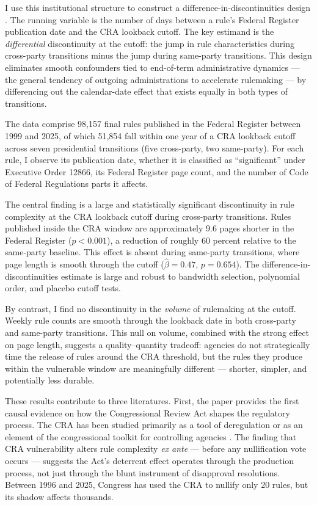\documentclass[12pt]{article}
\begin{document}
I use this institutional structure to construct a difference-in-discontinuities design \citep{grembi2016}. The running variable is the number of days between a rule's Federal Register publication date and the CRA lookback cutoff. The key estimand is the \textit{differential} discontinuity at the cutoff: the jump in rule characteristics during cross-party transitions minus the jump during same-party transitions. This design eliminates smooth confounders tied to end-of-term administrative dynamics --- the general tendency of outgoing administrations to accelerate rulemaking --- by differencing out the calendar-date effect that exists equally in both types of transitions.

The data comprise 98,157 final rules published in the Federal Register between 1999 and 2025, of which 51,854 fall within one year of a CRA lookback cutoff across seven presidential transitions (five cross-party, two same-party). For each rule, I observe its publication date, whether it is classified as ``significant'' under Executive Order 12866, its Federal Register page count, and the number of Code of Federal Regulations parts it affects.

The central finding is a large and statistically significant discontinuity in rule complexity at the CRA lookback cutoff during cross-party transitions. Rules published inside the CRA window are approximately 9.6 pages shorter in the Federal Register ($p < 0.001$), a reduction of roughly 60 percent relative to the same-party baseline. This effect is absent during same-party transitions, where page length is smooth through the cutoff ($\hat{\beta} = 0.47$, $p = 0.654$). The difference-in-discontinuities estimate is large and robust to bandwidth selection, polynomial order, and placebo cutoff tests.

By contrast, I find no discontinuity in the \textit{volume} of rulemaking at the cutoff. Weekly rule counts are smooth through the lookback date in both cross-party and same-party transitions. This null on volume, combined with the strong effect on page length, suggests a quality--quantity tradeoff: agencies do not strategically time the release of rules around the CRA threshold, but the rules they produce within the vulnerable window are meaningfully different --- shorter, simpler, and potentially less durable.

These results contribute to three literatures. First, the paper provides the first causal evidence on how the Congressional Review Act shapes the regulatory process. The CRA has been studied primarily as a tool of deregulation \citep{beermann2012} or as an element of the congressional toolkit for controlling agencies \citep{carey2021}. The finding that CRA vulnerability alters rule complexity \textit{ex ante} --- before any nullification vote occurs --- suggests the Act's deterrent effect operates through the production process, not just through the blunt instrument of disapproval resolutions. Between 1996 and 2025, Congress has used the CRA to nullify only 20 rules, but its shadow affects thousands.
\end{document}
